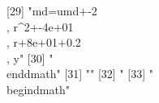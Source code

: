  [29] "{md}={umd}+-2\\, {r}^{2}+-4e+01\\, {r}+8e+01+0.2\\, {y}"                                                                                                                                                                                                                                                                                                                                                                                                                                     
 [30] "\\end{dmath}"                                                                                                                                                                                                                                                                                                                                                                                                                                                                                
 [31] ""                                                                                                                                                                                                                                                                                                                                                                                                                                                                                            
 [32] "%
 [33] "\\begin{dmath}"                                                                                                                                                                                                                                                                                                                                                                                                                                                                              
